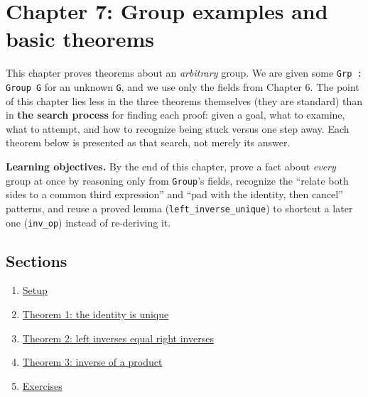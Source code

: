 \chapter{Chapter 7: Group examples and basic theorems}\label{sec:07-group-theorems:00-index:1}

This chapter proves theorems about an \emph{arbitrary} group. We are given some \texttt{Grp : Group G} for an unknown \texttt{G}, and we use only the fields from Chapter 6. The point of this chapter lies less in the three theorems themselves (they are standard) than in \textbf{the search process} for finding each proof: given a goal, what to examine, what to attempt, and how to recognize being stuck versus one step away. Each theorem below is presented as that search, not merely its answer.

\textbf{Learning objectives.} By the end of this chapter, prove a fact about \emph{every} group at once by reasoning only from \texttt{Group}'s fields, recognize the ``relate both sides to a common third expression'' and ``pad with the identity, then cancel'' patterns, and reuse a proved lemma (\texttt{left\_inverse\_unique}) to shortcut a later one (\texttt{inv\_op}) instead of re-deriving it.

\section{Sections}\label{sec:07-group-theorems:00-index:2}

\begin{enumerate}
\def\labelenumi{\arabic{enumi}.}
\tightlist
\item
  \hyperref[sec:07-group-theorems:01-setup:1]{Setup}
\item
  \hyperref[sec:07-group-theorems:02-theorem-1:1]{Theorem 1: the identity is unique}
\item
  \hyperref[sec:07-group-theorems:03-theorem-2:1]{Theorem 2: left inverses equal right inverses}
\item
  \hyperref[sec:07-group-theorems:04-theorem-3:1]{Theorem 3: inverse of a product}
\item
  \hyperref[sec:07-group-theorems:05-exercises:1]{Exercises}
\end{enumerate}






